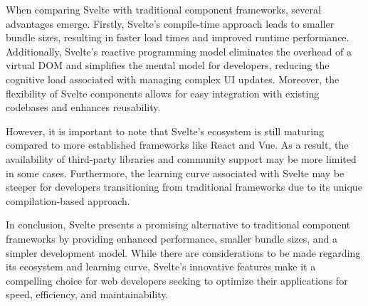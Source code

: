 When comparing Svelte with traditional component frameworks, several advantages emerge. Firstly, Svelte's compile-time approach leads to smaller bundle sizes, resulting in faster load times and improved runtime performance. Additionally, Svelte's reactive programming model eliminates the overhead of a virtual DOM and simplifies the mental model for developers, reducing the cognitive load associated with managing complex UI updates. Moreover, the flexibility of Svelte components allows for easy integration with existing codebases and enhances reusability.

However, it is important to note that Svelte's ecosystem is still maturing compared to more established frameworks like React and Vue. As a result, the availability of third-party libraries and community support may be more limited in some cases. Furthermore, the learning curve associated with Svelte may be steeper for developers transitioning from traditional frameworks due to its unique compilation-based approach.

In conclusion, Svelte presents a promising alternative to traditional component frameworks by providing enhanced performance, smaller bundle sizes, and a simpler development model. While there are considerations to be made regarding its ecosystem and learning curve, Svelte's innovative features make it a compelling choice for web developers seeking to optimize their applications for speed, efficiency, and maintainability.

